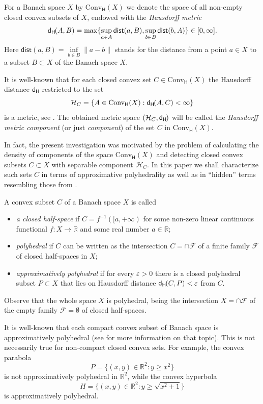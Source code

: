 \documentclass{amsart}
\newcommand{\IR}{\mathbb R}
\newcommand{\e}{\varepsilon}
\newcommand{\Conv}{\mathrm{Conv}}
\newcommand{\HH}{\mathcal H}
\newcommand{\dist}{\mathsf{dist}}
\newcommand{\F}{\mathcal F}
\newcommand{\dH}{\mathsf{d}_{\mathsf H}\kern-1pt}
\newcommand{\ConvH}{\Conv_{\mathsf H}}
\theoremstyle{definition}
\begin{document}
For a Banach space $X$ by $\ConvH(X)$ we denote the space of all non-empty closed convex subsets of $X$,  endowed with the {\em Hausdorff metric}
$$\dH(A,B)=\max\{\sup_{a\in A}\dist(a,B),\sup_{b\in B}\dist(b,A)\}\in[0,\infty].$$
Here $\dist(a,B)=\inf\limits_{b\in B}\|a-b\|$ stands for the distance from a point $a\in X$ to a subset $B\subset X$ of the Banach space $X$.

It is well-known  that for each closed convex set $C\in\ConvH(X)$ the Hausdorff distance $\dH$ restricted to the set
$$\HH_C=\{A\in\ConvH(X):\dH(A,C)<\infty\}$$is a metric, see \cite[Ch2]{Sendov}. The obtained metric space $(\HH_C,\dH)$ will be called the {\em Hausdorff metric component} (or just {\em component}) of the set $C$ in $\ConvH(X)$.

In fact, the present investigation was motivated by the problem of calculating the density of components of the space $\ConvH(X)$ and detecting closed convex subsets $C\subset X$ with separable component $\HH_C$. In this paper we shall characterize such sets $C$ in terms of approximative polyhedrality as well as in ``hidden'' terms resembling those from \cite{BH}.

A convex subset $C$ of a Banach space $X$ is called
\begin{itemize}
\item {\em a closed half-space} if $C=f^{-1}([a,+\infty)$ for  some non-zero linear continuous functional $f:X\to\IR$ and some real number $a\in\IR$;
\item {\em polyhedral} if $C$ can be written as the intersection $C=\cap \mathcal F$ of a finite family $\mathcal F$ of closed half-spaces in $X$;
\item {\em approximatively polyhedral} if for every $\e>0$ there is a closed polyhedral subset $P\subset X$ that lies on  Hausdorff distance $\dH(C,P)<\e$ from $C$.
\end{itemize}

Observe that the whole space $X$ is polyhedral, being the intersection $X=\cap\F$ of the empty family $\F=\emptyset$ of closed half-spaces.

It is well-known that each compact convex subset of Banach space is approximatively polyhedral (see \cite{Gruber} for more information on that topic). This is not necessarily true for non-compact closed convex sets. For example, the convex parabola
$$P=\big\{(x,y)\in\IR^2:y\ge x^2\big\}$$is not approximatively polyhedral in $\IR^2$, while the convex hyperbola
$$H=\big\{(x,y)\in\IR^2:y\ge \sqrt{x^2+1}\big\}$$is approximatively polyhedral.
\end{document}

